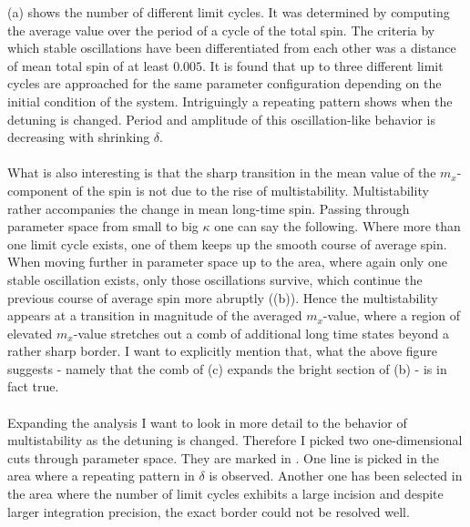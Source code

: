(a) shows the number of different limit cycles. It was determined by computing the average value over the period of a cycle of the total spin. The criteria by which stable oscillations have been differentiated from each other was a distance of mean total spin of at least $0.005$. It is found that up to three different limit cycles are approached for the same parameter configuration depending on the initial condition of the system. Intriguingly a repeating pattern shows when the detuning is changed. Period and amplitude of this oscillation-like behavior is decreasing with shrinking $\delta$. \\\\What is also interesting is that the sharp transition in the mean value of the $m_x$-component of the spin is not due to the rise of multistability. Multistability rather accompanies the change in mean long-time spin. Passing through parameter space from small to big $\kappa$ one can say the following. Where more than one limit cycle exists, one of them keeps up the smooth course of average spin. When moving further in parameter space up to the area, where again only one stable oscillation exists, only those oscillations survive, which continue the previous course of average spin more abruptly ((b)). Hence the multistability appears at a transition in magnitude of the averaged $m_x$-value, where a region of elevated $m_x$-value stretches out a comb of additional long time states beyond a rather sharp border. I want to explicitly mention that, what the above figure suggests - namely that the comb of (c) expands the bright section of (b) - is in  fact true.\\\\
Expanding the analysis I want to look in more detail to the behavior of multistability as the detuning is changed. Therefore I picked two one-dimensional cuts through parameter space. They are marked in . One line is picked in the area where a repeating pattern in $\delta$ is observed. Another one has been selected in the area where the number of limit cycles exhibits a large incision and despite larger integration precision, the exact border could not be resolved well. \\\\
